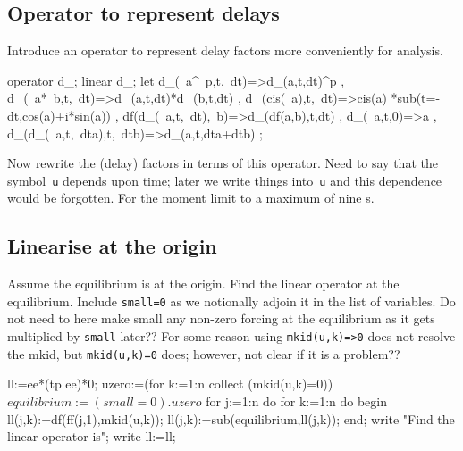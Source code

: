 \documentclass[11pt,a5paper]{article}
\begin{document}
\subsection{Operator to represent delays}

Introduce an operator to represent delay factors more
conveniently for analysis.
\begin{reduce}
operator d_; linear d_;
let { d_(~a^~p,t,~dt)=>d_(a,t,dt)^p
    , d_(~a*~b,t,~dt)=>d_(a,t,dt)*d_(b,t,dt)
    , d_(cis(~a),t,~dt)=>cis(a)
        *sub(t=-dt,cos(a)+i*sin(a))
    , df(d_(~a,t,~dt),~b)=>d_(df(a,b),t,dt)
    , d_(~a,t,0)=>a
    , d_(d_(~a,t,~dta),t,~dtb)=>d_(a,t,dta+dtb)
    };
\end{reduce}

Now rewrite the (delay) factors in terms of this operator.
Need to say that the symbol~\verb|u| depends upon time;
later we write things into~\verb|u| and this dependence
would be forgotten. For the moment limit to a maximum of
nine \ode{}s.



\subsection{Linearise at the origin}

Assume the equilibrium is at the origin. Find the linear
operator at the equilibrium. Include \verb|small=0| as we
notionally adjoin it in the list of variables. Do not need
to here make small any non-zero forcing at the equilibrium
as it gets multiplied by \verb|small| later?? For some
reason using \verb|mkid(u,k)=>0| does not resolve the mkid,
but \verb|mkid(u,k)=0| does; however, not clear if it is a
problem??
\begin{reduce}
ll:=ee*(tp ee)*0; %
uzero:=(for k:=1:n collect (mkid(u,k)=0))$
equilibrium:=(small=0).uzero$
for j:=1:n do for k:=1:n do begin 
  ll(j,k):=df(ff(j,1),mkid(u,k));
  ll(j,k):=sub(equilibrium,ll(j,k));
end;
write "Find the linear operator is";
write ll:=ll;
\end{reduce}
\end{document}
